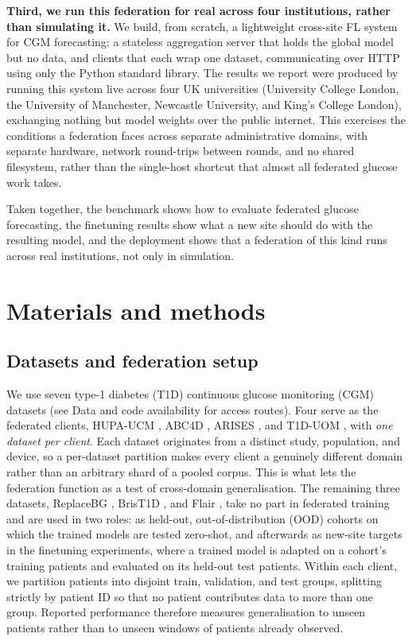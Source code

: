 \documentclass[10pt,letterpaper]{article}
\begin{document}
\textbf{Third, we run this federation for real across four institutions, rather
than simulating it.} We build, from scratch, a lightweight cross-site FL
system for CGM forecasting: a stateless aggregation server that holds the
global model but no data, and clients that each wrap one dataset,
communicating over HTTP using only the Python standard library. The results
we report were produced by running this system live across four UK
universities (University College London, the University of Manchester,
Newcastle University, and King's College London), exchanging nothing
but model weights over the public internet. This exercises the conditions a
federation faces across separate administrative domains, with separate
hardware, network round-trips between rounds, and no shared filesystem,
rather than the single-host shortcut that almost all federated glucose work
takes.

Taken together, the benchmark shows how to evaluate federated glucose
forecasting, the finetuning results show what a new site should do with the
resulting model, and the deployment shows that a federation of this kind
runs across real institutions, not only in simulation.

\section*{Materials and methods}

\subsection*{Datasets and federation setup}

We use seven type-1 diabetes (T1D) continuous glucose
monitoring (CGM) datasets (see Data and code availability for access routes).
Four serve as the federated clients, HUPA-UCM \cite{hidalgo2024hupaucm},
ABC4D \cite{abc4d_nct}, ARISES \cite{zhu2022arises}, and T1D-UOM
\cite{alsuhaymi2025t1duom}, with \emph{one dataset per client}. Each dataset
originates from a distinct study, population, and device, so a per-dataset
partition makes every client a genuinely different domain rather than an
arbitrary shard of a pooled corpus. This is what lets the federation function as
a test of cross-domain generalisation. The remaining three datasets,
ReplaceBG \cite{aleppo2017replacebg}, BrisT1D \cite{james2025brist1d}, and Flair
\cite{jaeb_flair}, take no part in federated training and are used in two
roles: as held-out, out-of-distribution (OOD) cohorts on which the trained
models are tested zero-shot, and afterwards as new-site targets in the
finetuning experiments, where a trained model is adapted on a cohort's
training patients and evaluated on its held-out test patients. Within
each client, we partition patients
into disjoint train, validation, and test groups, splitting strictly by
patient ID so that no patient contributes data to more than one group. Reported performance therefore measures generalisation to
unseen patients rather than to unseen windows of patients already observed.
\end{document}
